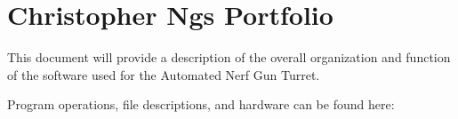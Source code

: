 \chapter{Christopher Ng\textquotesingle{}s Portfolio}
\hypertarget{index}{}\label{index}
This document will provide a description of the overall organization and function of the software used for the Automated Nerf Gun Turret.

Program operations, file descriptions, and hardware can be found here\+:
\begin{DoxyItemize}
\item {}
\item {}
\item {} 
\end{DoxyItemize}


